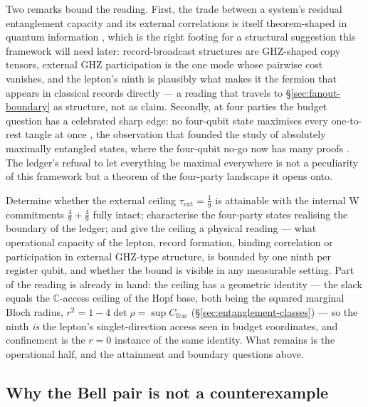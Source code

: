 Two remarks bound the reading. First, the trade between a system's residual entanglement capacity
and its external correlations is itself theorem-shaped in quantum information
\autocite{koashiwinter2004}, which is the right footing for a structural suggestion this
framework will need later: record-broadcast structures are GHZ-shaped copy tensors, external GHZ
participation is the one mode whose pairwise cost vanishes, and the lepton's ninth is plausibly
what makes it the fermion that appears in classical records directly --- a reading that travels to
\S\ref{sec:fanout-boundary} as structure, not as claim. Secondly, at four parties the budget
question has a celebrated sharp edge: no four-qubit state maximises every one-to-rest tangle at
once \autocite{higuchisudbery2000}, the observation that founded the study of absolutely
maximally entangled states, where the four-qubit no-go now has many proofs
\autocite{hubersiewert2026}. The ledger's refusal to let everything be maximal everywhere is not
a peculiarity of this framework but a theorem of the four-party landscape it opens onto.

\begin{openproblem}\label{op:w-slack}
Determine whether the external ceiling $\tau_{\mathrm{ext}} = \tfrac19$ is attainable with the
internal W commitments $\tfrac49 + \tfrac49$ fully intact; characterise the four-party states
realising the boundary of the ledger; and give the ceiling a physical reading --- what operational
capacity of the lepton, record formation, binding correlation or participation in external
GHZ-type structure, is bounded by one ninth per register qubit, and whether the bound is visible
in any measurable setting. Part of the reading is already in hand: the ceiling has a geometric
identity --- the slack equals the $\mathbb{C}$-access ceiling of the Hopf base, both being the
squared marginal Bloch radius, $r^{2} = 1 - 4\det\rho = \sup C_{\mathrm{frac}}$
(\S\ref{sec:entanglement-classes}) --- so the ninth \emph{is} the lepton's singlet-direction
access seen in budget coordinates, and confinement is the $r = 0$ instance of the same identity.
What remains is the operational half, and the attainment and boundary questions above.
\end{openproblem}

\subsection{Why the Bell pair is not a counterexample}\label{sec:bell-not-counterexample}

